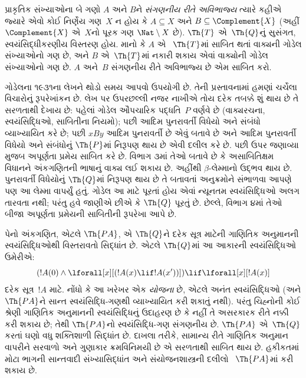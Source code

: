\begin{prob}
પ્રાકૃતિક સંખ્યાઓના બે
ગણો $A$ અને $B$ને
\emph{સંગણનીય રીતે
અવિભાજ્ય} ત્યારે કહીએ
જ્યારે એવો કોઈ
નિર્ણેય ગણ~$X$
ન હોય કે
$A \subseteq X$ અને
$B \subseteq \Complement{X}$
(અહીં $\Complement{X}$
એ~$X$નો પૂરક ગણ
$\Nat \setminus X$ છે).
$\Th{T}$ એ~$\Th{Q}$નું
સુસંગત,
સ્વયંસિદ્ધીકરણીય વિસ્તરણ
હોય. માનો કે $A$ એ
~$\Th{T}$માં સાબિત
થતાં વાક્યની
ગોડેલ સંખ્યાઓનો ગણ છે,
અને $B$ એ~$\Th{T}$માં
નકારી શકાય એવાં
વાક્યોની ગોડેલ
સંખ્યાઓનો ગણ છે.
$A$ અને~$B$ સંગણનીય
રીતે અવિભાજ્ય છે એમ
સાબિત કરો.
\end{prob}
\endgroup


\begingroup
\makeatletter{}\makeatother


\label{guunit:OLP-0317}


ગોડેલના ૧૯૩૧ના લેખને
થોડો સમય આપવો ઉપયોગી છે.
તેની પ્રસ્તાવનામાં હમણાં
ચર્ચેલા વિચારોનું રૂપરેખાંકન
છે. લેખ પર ઉપરછલ્લી
નજર નાખીએ તોય દરેક
તબક્કે શું થાય છે તે
સરળતાથી દેખાય છે:
પહેલાં ગોડેલ ઔપચારિક
પદ્ધતિ~$P$ વર્ણવે છે
(વાક્યરચના, સ્વયંસિદ્ધિઓ,
સાબિતીના નિયમો); પછી
આદિમ પુનરાવર્તી વિધેયો
અને સંબંધો વ્યાખ્યાયિત
કરે છે; પછી $x B y$
આદિમ પુનરાવર્તી છે એવું
બતાવે છે અને આદિમ
પુનરાવર્તી વિધેયો અને
સંબંધોનું $\Th{P}$માં
નિરૂપણ થાય છે એવી
દલીલ કરે છે. પછી ઉપર
જણાવ્યા મુજબ અપૂર્ણતા
પ્રમેય સાબિત કરે છે.
વિભાગ ૩માં તેઓ બતાવે છે
કે અસાબિતિક્ષમ વિધાનને
અંકગણિતની ભાષાનું વાક્ય
લઈ શકાય છે. અહીંથી
$\beta$-લેમ્માનો ઉદ્ભવ
થાય છે. પુનરાવર્તી
વિધેયોનું $\Th{Q}$માં
નિરૂપણ થાય છે તે
બતાવતાં અનુક્રમોને
સંભાળવા આપણે પણ આ
લેમ્મા વાપર્યું હતું.
ગોડેલ આ માટે પૂરતાં હોય
એવાં ન્યૂનતમ સ્વયંસિદ્ધિઓ
અલગ તારવતા નથી; પરંતુ
હવે જાણીએ છીએ કે
$\Th{Q}$ પૂરતું છે.
છેલ્લે, વિભાગ ૪માં
તેઓ બીજા અપૂર્ણતા
પ્રમેયની સાબિતીની
રૂપરેખા આપે છે.
\endgroup


\begingroup
\makeatletter{}\makeatother


\label{guunit:OLP-0318}


પેનો અંકગણિત, એટલે
$\Th{PA}$, એ
$\Th{Q}$ને દરેક
સૂત્ર માટેની
ગાણિતિક અનુમાનની
સ્વયંસિદ્ધિઓથી વિસ્તરાવતો
સિદ્ધાંત છે. એટલે
$\Th{Q}$માં આ આકારની
સ્વયંસિદ્ધિઓ ઉમેરીએ:
\[
(!A(0) \land \lforall[x][(!A(x) \lif !A(x'))]) \lif \lforall[x][!A(x)]
\]
દરેક સૂત્ર~$!A$
માટે. નોંધો કે આ ખરેખર
એક \emph{યોજના} છે,
એટલે અનંત સ્વયંસિદ્ધિઓ
(અને $\Th{PA}$ને સાન્ત
સ્વયંસિદ્ધિ-ગણથી
વ્યાખ્યાયિત કરી શકાતું
નથી). પરંતુ ચિહ્નોની
કોઈ શ્રેણી ગાણિતિક
અનુમાનની સ્વયંસિદ્ધિનું
ઉદાહરણ છે કે નહીં તે
અસરકારક રીતે નક્કી કરી
શકાય છે; તેથી
$\Th{PA}$નો સ્વયંસિદ્ધિ-ગણ
સંગણનીય છે. $\Th{PA}$
એ~$\Th{Q}$ કરતાં ઘણો
વધુ શક્તિશાળી સિદ્ધાંત
છે. દાખલા તરીકે, સામાન્ય
રીતે ગાણિતિક અનુમાન
વાપરીને સરવાળો અને ગુણાકાર
ક્રમવિનિમયી છે એ સરળતાથી
સાબિત થાય છે. હકીકતમાં
મોટા ભાગની સાન્તવાદી
સંખ્યાસિદ્ધાંત અને
સંયોજનશાસ્ત્રની દલીલો
~$\Th{PA}$માં કરી શકાય છે.

